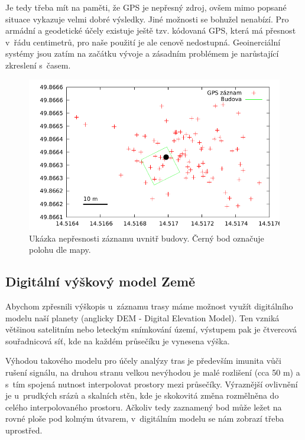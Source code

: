 \documentclass[thesis=B,czech]{FITthesis}[2012/06/26]
\begin{document}
Je tedy třeba mít na paměti, že GPS je nepřesný zdroj, ovšem mimo popsané situace vykazuje velmi dobré výsledky. Jiné možnosti se bohužel nenabízí. Pro armádní a geodetické účely existuje ještě tzv. kódovaná GPS, která má přesnost v~řádu centimetrů, pro naše použití je ale cenově nedostupná. Geoinerciální systémy jsou zatím na začátku vývoje a zásadním problémem je narůstající zkreslení s~časem.


 \begin{figure}\centering
 	\includegraphics{grafy/gps.pdf}
 	\caption{Ukázka nepřesnosti záznamu uvnitř budovy. Černý bod označuje polohu dle mapy.}
	\label{img:gpsSkakani}
 \end{figure}



\subsection{Digitální výškový model Země}
\label{dem}
Abychom zpřesnili výškopis u~záznamu trasy máme možnost využít digitálního modelu naší planety  (anglicky DEM - Digital Elevation Model). Ten vzniká většinou satelitním nebo leteckým snímkování území, výstupem pak je čtvercová souřadnicová síť, kde na každém průsečíku je vynesena výška. 

Výhodou takového modelu pro účely analýzy tras je především imunita vůči rušení signálu, na druhou stranu velkou nevýhodou je malé rozlišení (cca 50 m) a s~tím spojená nutnost interpolovat prostory mezi průsečíky. Výraznější ovlivnění je u~prudkých srázů a skalních stěn, kde je skokovitá změna rozmělněna do celého interpolovaného prostoru. Ačkoliv tedy zaznamený bod může ležet na rovné ploše pod kolmým útvarem, v~digitálním modelu se nám zobrazí třeba uprostřed.
\end{document}
